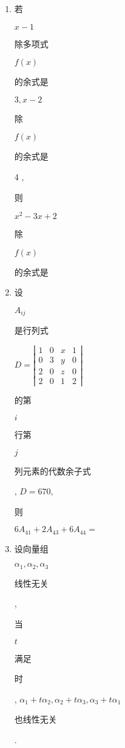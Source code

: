 \documentclass[10pt]{article}
\begin{document}
\begin{enumerate}
  \item \begin{CJK}{UTF8}{mj}若\end{CJK} $x-1$ \begin{CJK}{UTF8}{mj}除多项式\end{CJK} $f(x)$ \begin{CJK}{UTF8}{mj}的余式是\end{CJK} $3, x-2$ \begin{CJK}{UTF8}{mj}除\end{CJK} $f(x)$ \begin{CJK}{UTF8}{mj}的余式是\end{CJK} 4 , \begin{CJK}{UTF8}{mj}则\end{CJK} $x^{2}-3 x+2$ \begin{CJK}{UTF8}{mj}除\end{CJK} $f(x)$ \begin{CJK}{UTF8}{mj}的余式是\end{CJK}

  \item \begin{CJK}{UTF8}{mj}设\end{CJK} $A_{i j}$ \begin{CJK}{UTF8}{mj}是行列式\end{CJK} $D=\left|\begin{array}{llll}1 & 0 & x & 1 \\ 0 & 3 & y & 0 \\ 2 & 0 & z & 0 \\ 2 & 0 & 1 & 2\end{array}\right|$ \begin{CJK}{UTF8}{mj}的第\end{CJK} $i$ \begin{CJK}{UTF8}{mj}行第\end{CJK} $j$ \begin{CJK}{UTF8}{mj}列元素的代数余子式\end{CJK}, $D=670$, \begin{CJK}{UTF8}{mj}则\end{CJK} $6 A_{41}+2 A_{43}+6 A_{44}=$

  \item \begin{CJK}{UTF8}{mj}设向量组\end{CJK} $\alpha_{1}, \alpha_{2}, \alpha_{3}$ \begin{CJK}{UTF8}{mj}线性无关\end{CJK}, \begin{CJK}{UTF8}{mj}当\end{CJK} $t$ \begin{CJK}{UTF8}{mj}满足\end{CJK} \begin{CJK}{UTF8}{mj}时\end{CJK}, $\alpha_{1}+t \alpha_{2}, \alpha_{2}+t \alpha_{3}, \alpha_{3}+t \alpha_{1}$ \begin{CJK}{UTF8}{mj}也线性无关\end{CJK}.


\end{enumerate}
\end{document}
